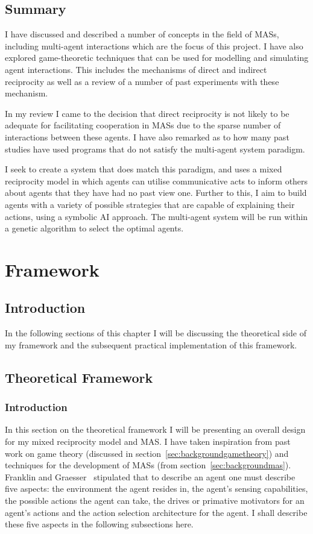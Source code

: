 \documentclass[]{final_report}
\begin{document}
\section{Summary}
I have discussed and described a number of concepts in the field of MASs, including multi-agent interactions which are the focus of this project. I have also explored game-theoretic techniques that can be used for modelling and simulating agent interactions. This includes the mechanisms of direct and indirect reciprocity as well as a review of a number of past experiments with these mechanism.\par 
In my review I came to the decision that direct reciprocity is not likely to be adequate for facilitating cooperation in MASs due to the sparse number of interactions between these agents. I have also remarked as to how many past studies have used programs that do not satisfy the multi-agent system paradigm.\par 
I seek to create a system that does match this paradigm, and uses a mixed reciprocity model in which agents can utilise communicative acts to inform others about agents that they have had no past view one. Further to this, I aim to build agents with a variety of possible strategies that are capable of explaining their actions, using a symbolic AI approach. The multi-agent system will be run within a genetic algorithm to select the optimal agents.

\chapter{Framework}

\section{Introduction}
In the following sections of this chapter I will be discussing the theoretical side of my framework and the subsequent practical implementation of this framework.

\section{Theoretical Framework}
\label{sec:theo}

\subsection{Introduction}
In this section on the theoretical framework I will be presenting an overall design for my mixed reciprocity model and MAS. I have taken inspiration from past work on game theory (discussed in section~\ref{sec:backgroundgametheory}) and techniques for the development of MASs (from section~\ref{sec:backgroundmas}). Franklin and Graesser~\cite{franklin1996agent} stipulated that to describe an agent one must describe five aspects: the environment the agent resides in, the agent's sensing capabilities, the possible actions the agent can take, the drives or primative motivators for an agent's actions and the action selection architecture for the agent. I shall describe these five aspects in the following subsections here.
\end{document}
